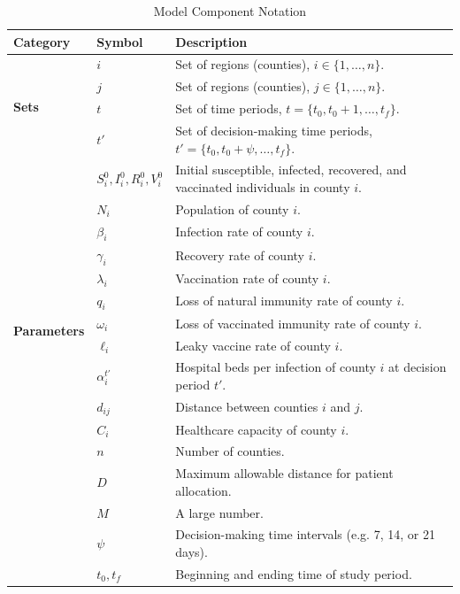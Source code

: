 \documentclass{article}
\begin{document}
\begin{table}[h]
    \caption{Model Component Notation}
    \centering
    \renewcommand{\arraystretch}{1.2}
    \begin{tabular}{|p{}|p{}|p{}|}
        \hline
        \textbf{Category} & \textbf{Symbol} & \textbf{Description} \\
        \hline
        \multirow{4}{*}{\textbf{Sets}} 
        & $i$ & Set of regions (counties), $i \in \{1, \ldots, n\}$. \\
        & $j$ & Set of regions (counties), $j \in \{1, \ldots, n\}$. \\
        & $t$ & Set of time periods, $t = \{ t_0, t_0 + 1, \ldots, t_f \}$. \\
        & $t'$ & Set of decision-making time periods, $t' = \{ t_0, t_0 + \psi, \ldots, t_f \}$. \\
        \hline
        \multirow{13}{*}{\textbf{Parameters}} 
        & $S_i^0, I_i^0, R_i^0, V_i^0$ & Initial susceptible, infected, recovered, and vaccinated individuals in county $i$. \\
        & $N_i$ & Population of county $i$. \\
        & $\beta_i$ & Infection rate of county $i$. \\
        & $\gamma_i$ & Recovery rate of county $i$. \\
        & $\lambda_i$ & Vaccination rate of county $i$. \\
        & $q_i$ & Loss of natural immunity rate of county $i$. \\
        & $\omega_i$ & Loss of vaccinated immunity rate of county $i$. \\
        & $\ell_i$ & Leaky vaccine rate of county $i$. \\
        & $\alpha_i^{t'}$ & Hospital beds per infection of county $i$ at decision period $t'$. \\
        & $d_{ij}$ & Distance between counties $i$ and $j$. \\
        & $C_i$ & Healthcare capacity of county $i$. \\
        & $n$ & Number of counties. \\
        & $D$ & Maximum allowable distance for patient allocation. \\
        & $M$ & A large number. \\
        & $\psi$ & Decision-making time intervals (e.g. 7, 14, or 21 days). \\
        & $t_0, t_f$ & Beginning and ending time of study period. \\

\end{tabular}
\end{table}
\end{document}
